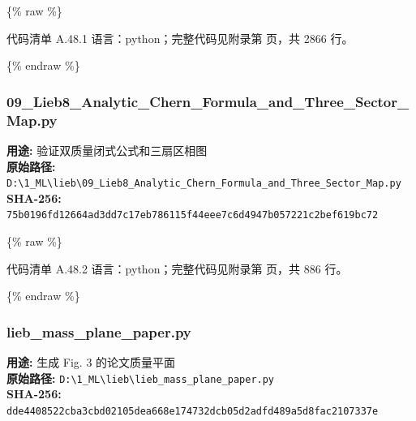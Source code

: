 \documentclass[lang=cn,scheme=chinese,color=blue,device=normal,toc=onecol,math=cm]{elegantbook}
\begin{document}
\{\% raw \%\}\par


\begin{codeindexbox}{代码清单 A.48.1}
语言：python；完整代码见附录第 \pageref{code:48:1} 页，共 2866 行。
\end{codeindexbox}


\{\% endraw \%\}\par


\subsubsection{09\_\allowbreak{}Lieb8\_\allowbreak{}Analytic\_\allowbreak{}Chern\_\allowbreak{}Formula\_\allowbreak{}and\_\allowbreak{}Three\_\allowbreak{}Sector\_\allowbreak{}Map.py}


\textbf{用途:} 验证双质量闭式公式和三扇区相图\\ \textbf{原始路径:} \texttt{D:\textbackslash{}\allowbreak{}1\_\allowbreak{}ML\textbackslash{}\allowbreak{}lieb\textbackslash{}\allowbreak{}09\_\allowbreak{}Lieb8\_\allowbreak{}Analytic\_\allowbreak{}Chern\_\allowbreak{}Formula\_\allowbreak{}and\_\allowbreak{}Three\_\allowbreak{}Sector\_\allowbreak{}Map.py}\\ \textbf{SHA-256:} \texttt{75b0196fd12664ad3dd7c17eb786115f44eee7c6d4947b057221c2bef619bc72}\par


\{\% raw \%\}\par


\begin{codeindexbox}{代码清单 A.48.2}
语言：python；完整代码见附录第 \pageref{code:48:2} 页，共 886 行。
\end{codeindexbox}


\{\% endraw \%\}\par


\subsubsection{lieb\_\allowbreak{}mass\_\allowbreak{}plane\_\allowbreak{}paper.py}


\textbf{用途:} 生成 Fig. 3 的论文质量平面\\ \textbf{原始路径:} \texttt{D:\textbackslash{}\allowbreak{}1\_\allowbreak{}ML\textbackslash{}\allowbreak{}lieb\textbackslash{}\allowbreak{}lieb\_\allowbreak{}mass\_\allowbreak{}plane\_\allowbreak{}paper.py}\\ \textbf{SHA-256:} \texttt{dde4408522cba3cbd02105dea668e174732dcb05d2adfd489a5d8fac2107337e}\par
\end{document}
